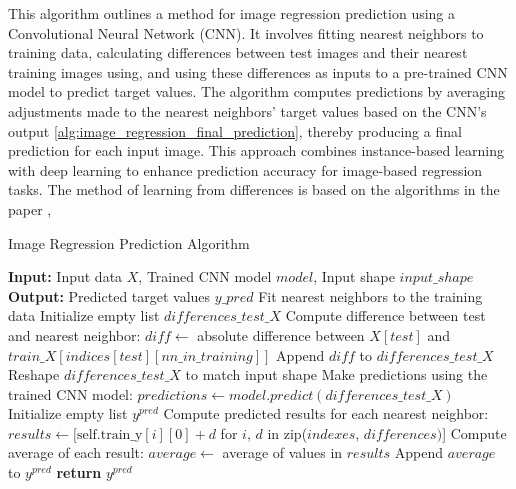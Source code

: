 \documentclass[a4paper, 12pt]{report}
\begin{document}
This algorithm outlines a method for image regression prediction using a Convolutional Neural Network (CNN). 
It involves fitting nearest neighbors to training data, calculating differences between test images and 
their nearest training images using, and using these differences as inputs to a pre-trained CNN model to predict 
target values. The algorithm computes predictions by averaging adjustments made to the nearest neighbors' 
target values based on the CNN's output \ref{alg:image_regression_final_prediction}, thereby producing a final prediction for each input image. 
This approach combines instance-based learning with deep learning to enhance prediction accuracy 
for image-based regression tasks. The method of learning from differences is based on the algorithms in the paper \cite{learningFromDifferences2022},
\begin{algorithm}[H]
    \caption{Image Regression Prediction Algorithm}
    \label{alg:image_regression_final_prediction}
    \begin{algorithmic}[1]
            \State \textbf{Input:} Input data $X$, Trained CNN model $model$, Input shape $input\_shape$
            \State \textbf{Output:} Predicted target values $y\_pred$
            \State Fit nearest neighbors to the training data
            \State Initialize empty list $differences\_test\_X$
             
                    \State Compute difference between test and nearest neighbor: 
                    \State \quad $diff \gets$ absolute difference between $X[test]$ and $train\_X[indices[test][nn\_in\_training]]$
                    \State Append $diff$ to $differences\_test\_X$
                \EndFor
            \EndFor
            \State Reshape $differences\_test\_X$ to match input shape
            \State Make predictions using the trained CNN model: $predictions \gets model.predict(differences\_test\_X)$
            \State Initialize empty list $y^{pred}$
                \State Compute predicted results for each nearest neighbor:
                \State \quad $results \gets [\text{self.train\_y}[i][0] + d$ for $i$, $d$ in zip($indexes$, $differences)$]
                \State Compute average of each result: $average \gets$ average of values in $results$
                \State Append $average$ to $y^{pred}$
            \EndFor
            \State \textbf{return} $y^{pred}$
        \EndFunction
    \end{algorithmic}
\end{algorithm}
\end{document}
